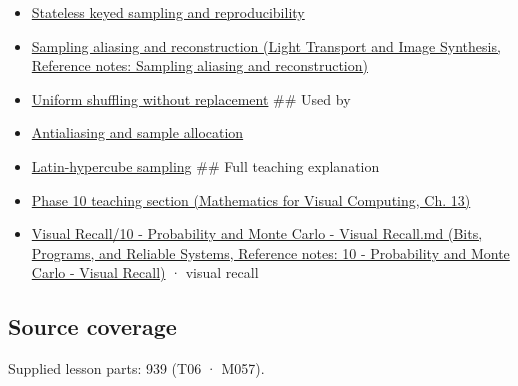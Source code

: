 \begin{itemize}
\item
  \hyperref[appendix-daaf25bfd3a0]{Stateless keyed sampling and reproducibility}
\item
  \href{../04-Light-Transport-and-Image-Synthesis/main.pdf\#nameddest=appendix-6a7869dd79a6}{Sampling aliasing and reconstruction (Light Transport and Image Synthesis, Reference notes: Sampling aliasing and reconstruction)}
\item
  \hyperref[appendix-184fcc411663]{Uniform shuffling without replacement} \#\# Used by
\item
  \hyperref[appendix-4192b2bdd21e]{Antialiasing and sample allocation}
\item
  \hyperref[appendix-1c5e85693a06]{Latin-hypercube sampling} \#\# Full teaching explanation
\item
  \href{../02-Mathematics-for-Visual-Computing/main.pdf\#nameddest=02-foundations-ii-ch029-a-computer-produces-deterministic-pseudorandom-sequences}{Phase 10 teaching section (Mathematics for Visual Computing, Ch. 13)}
\item
  \href{../01-Bits-Programs-and-Reliable-Systems/main.pdf\#nameddest=appendix-cb5af353ef77}{Visual Recall/10 - Probability and Monte Carlo - Visual Recall.md (Bits, Programs, and Reliable Systems, Reference notes: 10 - Probability and Monte Carlo - Visual Recall)} · visual recall
\end{itemize}

\subsection{Source coverage}\label{appendix-9f693ffd82bc-source-coverage}

Supplied lesson parts: 939 (T06 · M057).
